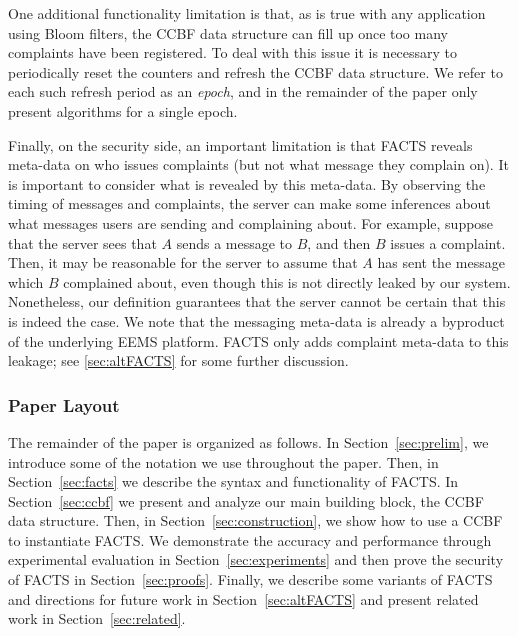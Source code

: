 One additional functionality limitation is that, as is true with any application using Bloom filters, the CCBF data structure can fill up once too many complaints have been registered.  To deal with this issue it is necessary to periodically reset the counters and refresh the CCBF data structure.  We refer to each such refresh period as an \emph{epoch}, and in the remainder of the paper only present algorithms for a single epoch.

Finally, on the security side, an important limitation is that FACTS reveals meta-data on who issues complaints (but not what message they complain on).  It is important to consider what is revealed by this meta-data.  By observing the timing of messages and complaints, the server can make some inferences about what messages users are sending and complaining about.  For example, suppose that the server sees that $A$ sends a message to $B$, and then $B$ issues a complaint. Then, it may be reasonable for the server to assume that $A$ has sent the message which $B$ complained about, even though this is not directly leaked by our system. Nonetheless, our definition guarantees that the server cannot be certain that this is indeed the case.  We note that the messaging meta-data is already a byproduct of the underlying EEMS platform.  FACTS only adds complaint meta-data to this leakage; see \cref{sec:altFACTS} for some further discussion.



\subsubsection{Paper Layout}
The remainder of the paper is organized as follows.  In Section~\ref{sec:prelim}, we introduce some of the notation we use throughout the paper.  Then, in Section~\ref{sec:facts} we describe the syntax and functionality of FACTS.  In Section~\ref{sec:ccbf} we present and analyze our main building block, the CCBF data structure.  Then, in Section~\ref{sec:construction}, we show how to use a CCBF to instantiate FACTS.  We demonstrate the accuracy and performance through experimental evaluation in Section~\ref{sec:experiments} and then prove the security of FACTS in Section~\ref{sec:proofs}.  Finally, we describe some variants of FACTS and directions for future work in Section~\ref{sec:altFACTS} and present related work in Section~\ref{sec:related}.

